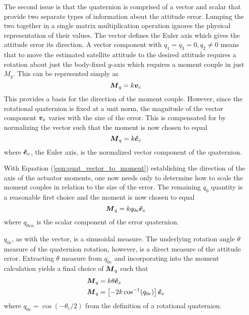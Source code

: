 The second issue is that the quaternion is comprised of a vector and scalar that provide two separate types of information about the attitude error.  Lumping the two together in a single matrix multiplication operation ignores the physical representation of their values.  The vector defines the Euler axis which gives the attitude error its direction.  A vector component with $q_1 = q_3 = 0, q_2 \ne 0$ means that to move the estimated satellite attitude to the desired attitude requires a rotation about just the body-fixed $y$-axis which requires a moment couple in just $M_y$.  This can be represented simply as
\begin{equation}
  \boldsymbol{M}_{q} = k\boldsymbol{v}_e
\end{equation}
This provides a basis for the direction of the moment couple.  However, since the rotational quaternion is fixed at a unit norm, the magnitude of the vector component $\boldsymbol{v}_e$ varies with the size of the error.  This is compensated for by normalizing the vector such that the moment is now chosen to equal
\begin{equation}
  \boldsymbol{M}_{q} = k\boldsymbol{\hat{e}}_e
  \label{eqn:quat_vector_to_moment}
\end{equation}
where $\boldsymbol{\hat{e}}_{e}$, the Euler axis, is the normalized vector component of the quaternion.

With Equation (\ref{eqn:quat_vector_to_moment}) establishing the direction of the axis of the actuator moments, one now needs only to determine how to scale the moment couples in relation to the size of the error.  The remaining $q_0$ quantity is a reasonable first choice and the moment is now chosen to equal
\begin{equation}
  \boldsymbol{M}_{q} = kq_{0e} \boldsymbol{\hat{e}}_e
\end{equation}
where $q_{0en}$ is the scalar component of the error quaternion.

$q_{0e}$, as with the vector, is a sinusoidal measure.  The underlying rotation angle $\theta$ measure of the quaternion rotation, however, is a direct measure of the attitude error.  Extracting $\theta$ measure from $q_{0e}$ and incorporating into the moment calculation yields a final choice of $\boldsymbol{M}_q$ such that
\begin{equation}
  \begin{aligned}
    \boldsymbol{M}_{q} &= k \theta \boldsymbol{\hat{e}}_e \\
    \boldsymbol{M}_{q} &= \left[- 2k \cos^{-1} (q_{0e}) \right] \boldsymbol{\hat{e}}_e
  \end{aligned}
  \label{eqn:QuaternionToMomentConversion}
\end{equation}
where $q_{0e} = \cos(-\theta_e/2)$ from the definition of a rotational quaternion.

